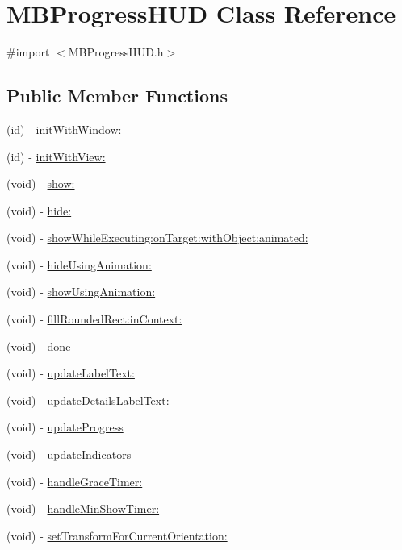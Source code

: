 \hypertarget{interface_m_b_progress_h_u_d}{
\section{MBProgressHUD Class Reference}
\label{interface_m_b_progress_h_u_d}
}


{\ttfamily \#import $<$MBProgressHUD.h$>$}

\subsection*{Public Member Functions}
\begin{DoxyCompactItemize}
\item 
(id) -\/ \hyperlink{interface_m_b_progress_h_u_d_ad99c92b4be7b1d6f7eb2762bbfce6c6e}{initWithWindow:}
\item 
(id) -\/ \hyperlink{interface_m_b_progress_h_u_d_ad5fd1005074eea7ba14a56b7256c1e47}{initWithView:}
\item 
(void) -\/ \hyperlink{interface_m_b_progress_h_u_d_a2399f0aa26eadb79a5ec7a7ff66ac9b9}{show:}
\item 
(void) -\/ \hyperlink{interface_m_b_progress_h_u_d_a7a511191430dbd182d69f85fb96c8a88}{hide:}
\item 
(void) -\/ \hyperlink{interface_m_b_progress_h_u_d_a09cc0168f613c61e322c18a3df1c916f}{showWhileExecuting:onTarget:withObject:animated:}
\item 
(void) -\/ \hyperlink{interface_m_b_progress_h_u_d_a702cc0f7d9fa3c6ead24f10910f87843}{hideUsingAnimation:}
\item 
(void) -\/ \hyperlink{interface_m_b_progress_h_u_d_a17b1c3c1493f9e4a48eeea0023591d84}{showUsingAnimation:}
\item 
(void) -\/ \hyperlink{interface_m_b_progress_h_u_d_a127ca9118e4fa3ad9159da4daac392e7}{fillRoundedRect:inContext:}
\item 
(void) -\/ \hyperlink{interface_m_b_progress_h_u_d_ab650651e4cda2869f73100c6fd2c821a}{done}
\item 
(void) -\/ \hyperlink{interface_m_b_progress_h_u_d_a1d61d7c9c4e477613dfd6d07b3377a8d}{updateLabelText:}
\item 
(void) -\/ \hyperlink{interface_m_b_progress_h_u_d_a9629b5ff700902ca97a7d07234b03391}{updateDetailsLabelText:}
\item 
(void) -\/ \hyperlink{interface_m_b_progress_h_u_d_ac0b3d882b8cd04f7a6de489cd3557050}{updateProgress}
\item 
(void) -\/ \hyperlink{interface_m_b_progress_h_u_d_aea71f80dc5011b14b0ff96cc7930e809}{updateIndicators}
\item 
(void) -\/ \hyperlink{interface_m_b_progress_h_u_d_a9f07c4812fc94f455556c66b3f8beef7}{handleGraceTimer:}
\item 
(void) -\/ \hyperlink{interface_m_b_progress_h_u_d_ad386fdf9b21c0a35c3fbb28b1adc5927}{handleMinShowTimer:}
\item 
(void) -\/ \hyperlink{interface_m_b_progress_h_u_d_a4b5bf5dc83bdf021f8038ec1a7521abe}{setTransformForCurrentOrientation:}
\end{DoxyCompactItemize}
